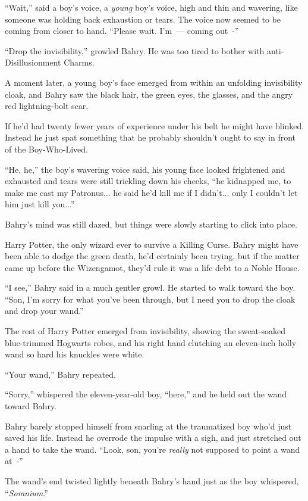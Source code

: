 ``Wait,'' said a boy's voice, a \emph{young} boy's voice, high and thin and wavering, like someone was holding back exhaustion or tears. The voice now seemed to be coming from closer to hand. ``Please wait. I'm~--- coming out~-''

``Drop the invisibility,'' growled Bahry. He was too tired to bother with anti-Disillusionment Charms.

A moment later, a young boy's face emerged from within an unfolding invisibility cloak, and Bahry saw the black hair, the green eyes, the glasses, and the angry red lightning-bolt scar.

If he'd had twenty fewer years of experience under his belt he might have blinked. Instead he just spat something that he probably shouldn't ought to say in front of the Boy-Who-Lived.

``He, he,'' the boy's wavering voice said, his young face looked frightened and exhausted and tears were still trickling down his cheeks, ``he kidnapped me, to make me cast my Patronus... he said he'd kill me if I didn't... only I couldn't let him just kill you...''

Bahry's mind was still dazed, but things were slowly starting to click into place.

Harry Potter, the only wizard ever to survive a Killing Curse. Bahry might have been able to dodge the green death, he'd certainly been trying, but if the matter came up before the Wizengamot, they'd rule it was a life debt to a Noble House.

``I see,'' Bahry said in a much gentler growl. He started to walk toward the boy. ``Son, I'm sorry for what you've been through, but I need you to drop the cloak and drop your wand.''

The rest of Harry Potter emerged from invisibility, showing the sweat-soaked blue-trimmed Hogwarts robes, and his right hand clutching an eleven-inch holly wand so hard his knuckles were white.

``Your wand,'' Bahry repeated.

``Sorry,'' whispered the eleven-year-old boy, ``here,'' and he held out the wand toward Bahry.

Bahry barely stopped himself from snarling at the traumatized boy who'd just saved his life. Instead he overrode the impulse with a sigh, and just stretched out a hand to take the wand. ``Look, son, you're \emph{really} not supposed to point a wand at~-''

The wand's end twisted lightly beneath Bahry's hand just as the boy whispered, ``\emph{Somnium}.''

